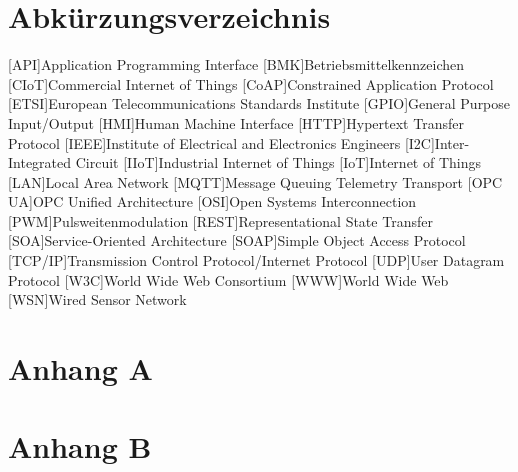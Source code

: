 \documentclass[BMR,Bachelor,ngerman]{twbook}%
\providecommand\listacroname{}
\renewcommand\listacroname{List of Abbreviations}
\renewcommand\listacroname{Abkürzungsverzeichnis}
\begin{document}
\chapter*{\listacroname}
\begin{acronym}[XXXXX]
	[API]{Application Programming Interface}
	[BMK]{Betriebsmittelkennzeichen}
	[CIoT]{Commercial Internet of Things}
	[CoAP]{Constrained Application Protocol}
	[ETSI]{European Telecommunications Standards Institute}
	[GPIO]{General Purpose Input/Output}
	[HMI]{Human Machine Interface}
	[HTTP]{Hypertext Transfer Protocol}
	[IEEE]{Institute of Electrical and Electronics Engineers}
	[I2C]{Inter-Integrated Circuit}
	[IIoT]{Industrial Internet of Things}
	[IoT]{Internet of Things}
	[LAN]{Local Area Network}
   	[MQTT]{Message Queuing Telemetry Transport}
	[OPC UA]{OPC Unified Architecture}
   	[OSI]{Open Systems Interconnection}
	[PWM]{Pulsweitenmodulation}
	[REST]{Representational State Transfer}
   	[SOA]{Service-Oriented Architecture}
	[SOAP]{Simple Object Access Protocol}
   	[TCP/IP]{Transmission Control Protocol/Internet Protocol}
	[UDP]{User Datagram Protocol}
	[W3C]{World Wide Web Consortium}
   	[WWW]{World Wide Web}
   	[WSN]{Wired Sensor Network}
\end{acronym}

%
%
\clearpage
\appendix
\chapter{Anhang A}
\clearpage
\chapter{Anhang B}
\end{document}
